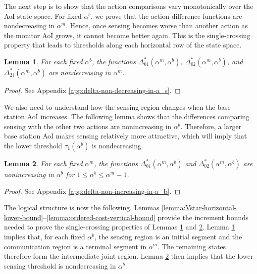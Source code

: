 \documentclass[letterpaper,journal]{IEEEtran}
\newtheorem{lemma}{Lemma}
\begin{document}
The next step is to show that the action comparisons vary monotonically over the AoI state space. For fixed $\alpha^b$, we prove that the action-difference functions are nondecreasing in $\alpha^m$. Hence, once sensing becomes worse than another action as the monitor AoI grows, it cannot become better again. This is the single-crossing property that leads to thresholds along each horizontal row of the state space.


\begin{lemma}\label{lemma:delta-non-decreasing-in-a_s}
For each fixed $\alpha^b$, the functions $\Delta^*_{01}(\alpha^m,\alpha^b)$, $\Delta^*_{02}(\alpha^m,\alpha^b)$, and $\Delta^*_{21}(\alpha^m,\alpha^b)$ are nondecreasing in $\alpha^m$.
\end{lemma}

\begin{proof}
See Appendix \ref{app:delta-non-decreasing-in-a_s}.
\end{proof}


We also need to understand how the sensing region changes when the base station AoI increases. The following lemma shows that the differences comparing sensing with the other two actions are nonincreasing in $\alpha^b$. Therefore, a larger base station AoI makes sensing relatively more attractive, which will imply that the lower threshold $\tau_1(\alpha^b)$ is nondecreasing.

\begin{lemma}\label{lemma:delta-non-increasing-in-a_b}
For each fixed $\alpha^m$, the functions $\Delta^*_{01}(\alpha^m,\alpha^b)$ and $\Delta^*_{02}(\alpha^m,\alpha^b)$ are nonincreasing in $\alpha^b$ for $1\leq \alpha^b\leq \alpha^m-1$.
\end{lemma}

\begin{proof}
See Appendix \ref{app:delta-non-increasing-in-a_b}.
\end{proof}

The logical structure is now the following. Lemmas \ref{lemma:Vstar-horizontal-lower-bound}--\ref{lemma:ordered-cost-vertical-bound} provide the increment bounds needed to prove the single-crossing properties of Lemmas \ref{lemma:delta-non-decreasing-in-a_s} and \ref{lemma:delta-non-increasing-in-a_b}. Lemma \ref{lemma:delta-non-decreasing-in-a_s} implies that, for each fixed $\alpha^b$, the sensing region is an initial segment and the communication region is a terminal segment in $\alpha^m$. The remaining states therefore form the intermediate joint region. Lemma \ref{lemma:delta-non-increasing-in-a_b} then implies that the lower sensing threshold is nondecreasing in $\alpha^b$.
\end{document}
